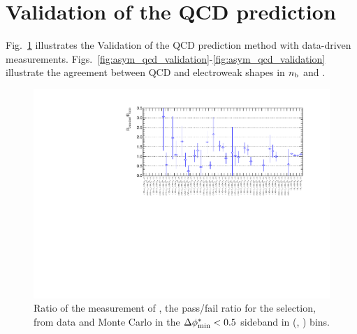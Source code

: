 \clearpage
\section{Validation of the QCD prediction \label{app:qcdPredictionValidation}}

Fig.~\ref{fig:RR_qcd} illustrates the Validation of the QCD prediction method with data-driven measurements. Figs.~\ref{fig:asym_qcd_validation}-\ref{fig:asym_qcd_validation} illustrate the agreement between QCD and electroweak shapes in $n_{\text{b}}$ and \mht.

\begin{figure}[h!]
  \begin{center}        
    \includegraphics[width=\textwidth]{figures/qcd/validation/RRPlot}
    \caption{ Ratio of the measurement of \rmhtmet, the pass/fail ratio for the \mhtmet selection, from data and Monte Carlo in the $\mbox{$\Delta\phi^{*}_{\rm min}$} < 0.5$ sideband in (\scalht, \njet) bins.  
    }

    \label{fig:RR_qcd}
  \end{center} 
\end{figure}


